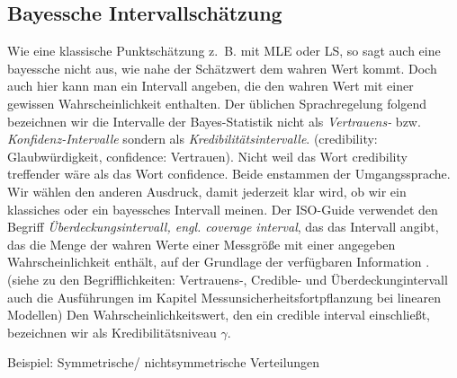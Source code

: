 \subsection{Bayessche Intervallschätzung}
Wie eine klassische Punktschätzung z.~B. mit MLE oder LS, so sagt auch eine bayessche nicht aus, wie nahe der Schätzwert dem wahren Wert kommt. Doch auch hier kann man ein Intervall angeben, die 
den wahren Wert mit einer gewissen Wahrscheinlichkeit enthalten. Der üblichen Sprachregelung folgend bezeichnen wir die Intervalle der Bayes-Statistik nicht als \textit{Vertrauens-} bzw. \textit{Konfidenz-Intervalle} sondern als 
\textit{Kredibilitätsintervalle}. (credibility: Glaubwürdigkeit, confidence: Vertrauen). 
Nicht weil das Wort credibility treffender wäre als das Wort confidence. Beide enstammen der Umgangssprache. Wir wählen den anderen Ausdruck, damit jederzeit klar wird, ob wir ein klassiches oder ein bayessches Intervall meinen. 
Der ISO-Guide verwendet den Begriff 
\textit{Überdeckungsintervall, engl. coverage interval},
das das Intervall angibt, das die Menge der wahren Werte einer Messgröße
mit einer angegeben Wahrscheinlichkeit enthält, auf der Grundlage der
verfügbaren Information \cite{VIM08}. 
(siehe zu den Begrifflichkeiten: Vertrauens-, Credible- und Überdeckungintervall auch die Ausführungen im Kapitel \glqq Messunsicherheitsfortpflanzung bei linearen
Modellen\grqq)
Den Wahrscheinlichkeitswert, den ein credible interval einschließt, bezeichnen wir als Kredibilitätsniveau $\gamma.$

Beispiel: Symmetrische/ nichtsymmetrische Verteilungen

